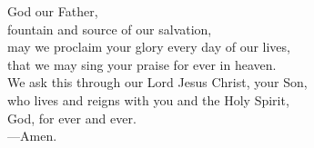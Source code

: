 \prayer


\begin{prayerverse}
God our Father,\\
fountain and source of our salvation,\\
may we proclaim your glory every day of our lives,\\
that we may sing your praise for ever in heaven.\\
We ask this through our Lord Jesus Christ, your Son,\\
who lives and reigns with you and the Holy Spirit,\\
God, for ever and ever.\\
{\color{red}---\thinspace}Amen.
\end{prayerverse}

